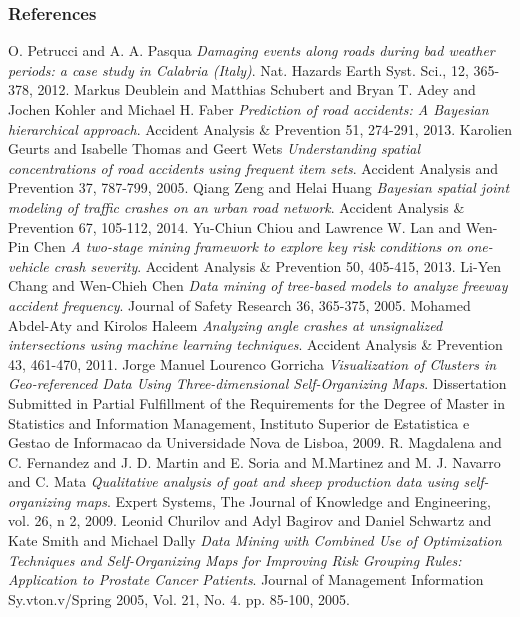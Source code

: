 \documentclass[hyperref={pdfpagelabels=true}]{beamer}
\begin{document}
\begin{frame}[allowframebreaks]
\frametitle{References}
\tiny{
 \begin{thebibliography}{ab}
   O. Petrucci and A. A. Pasqua {\em Damaging events along roads during bad weather periods: a case study in Calabria (Italy)}. Nat. Hazards Earth Syst. Sci., 12, 365-378, 2012. 
   Markus Deublein and Matthias Schubert and Bryan T. Adey and Jochen Kohler and Michael H. Faber {\em Prediction of road accidents: A Bayesian hierarchical approach}. Accident Analysis \& Prevention 51, 274-291, 2013.
   Karolien Geurts and Isabelle Thomas and Geert Wets {\em Understanding spatial concentrations of road accidents using frequent item sets}. Accident Analysis and Prevention 37, 787-799, 2005.
   Qiang Zeng and Helai Huang {\em Bayesian spatial joint modeling of traffic crashes on an urban road network}. Accident Analysis \& Prevention 67, 105-112, 2014.
   Yu-Chiun Chiou and Lawrence W. Lan and Wen-Pin Chen {\em A two-stage mining framework to explore key risk conditions on one-vehicle crash severity}. Accident Analysis \& Prevention 50, 405-415, 2013.
   Li-Yen Chang and Wen-Chieh Chen {\em Data mining of tree-based models to analyze freeway accident frequency}. Journal of Safety Research 36, 365-375, 2005.
   Mohamed Abdel-Aty and Kirolos Haleem {\em Analyzing angle crashes at unsignalized intersections using machine learning techniques}. Accident Analysis \& Prevention 43, 461-470, 2011.
   Jorge Manuel Lourenco Gorricha {\em Visualization of Clusters in Geo-referenced Data Using Three-dimensional Self-Organizing Maps}. Dissertation Submitted in Partial Fulfillment of the Requirements for the Degree of Master in Statistics and Information Management, Instituto Superior de Estatistica e Gestao de Informacao da Universidade Nova de Lisboa, 2009.
   R. Magdalena and C. Fernandez and J. D. Martin and E. Soria and M.Martinez and M. J. Navarro and C. Mata {\em Qualitative analysis of goat and sheep production data using self-organizing maps}. Expert Systems, The Journal of Knowledge and Engineering, vol. 26, n 2, 2009.
   Leonid Churilov and Adyl Bagirov and Daniel Schwartz and Kate Smith and Michael Dally {\em Data Mining with Combined Use of Optimization Techniques and Self-Organizing Maps for Improving Risk Grouping Rules: Application to Prostate Cancer Patients}. Journal of Management Information Sy.vton.v/Spring 2005, Vol. 21, No. 4. pp. 85-100, 2005.  

\end{thebibliography}}
\end{frame}
\end{document}
